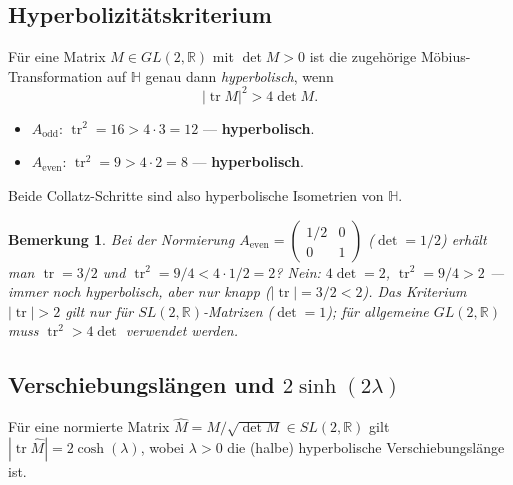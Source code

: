 \documentclass[12pt,a4paper]{article}
\newtheorem{bemerkung}{Bemerkung}[section]
\newcommand{\sinh}{\operatorname{sinh}}
\renewcommand{\cosh}{\operatorname{cosh}}
\newcommand{\tr}{\operatorname{tr}}
\newcommand{\R}{\mathbb{R}}
\begin{document}
\subsection{Hyperbolizitätskriterium}

Für eine Matrix $M \in GL(2,\R)$ mit $\det M > 0$ ist die zugehörige
Möbius-Transformation auf $\mathbb{H}$ genau dann \emph{hyperbolisch}, wenn
\[
  |\tr M|^2 > 4 \det M.
\]
\begin{itemize}[leftmargin=2em]
  \item $A_{\text{odd}}$: $\tr^2 = 16 > 4 \cdot 3 = 12$ — \textbf{hyperbolisch}.
  \item $A_{\text{even}}$: $\tr^2 = 9 > 4 \cdot 2 = 8$ — \textbf{hyperbolisch}.
\end{itemize}
Beide Collatz-Schritte sind also hyperbolische Isometrien von $\mathbb{H}$.

\begin{bemerkung}
Bei der Normierung $A_{\text{even}} = \begin{pmatrix}1/2&0\\0&1\end{pmatrix}$
($\det = 1/2$) erhält man $\tr = 3/2$ und $\tr^2 = 9/4 < 4 \cdot 1/2 = 2$? Nein:
$4\det = 2$, $\tr^2 = 9/4 > 2$ — immer noch hyperbolisch,
aber nur knapp ($|\tr| = 3/2 < 2$). Das Kriterium $|\tr| > 2$ gilt nur für
$SL(2,\R)$-Matrizen ($\det = 1$); für allgemeine $GL(2,\R)$ muss $\tr^2 > 4\det$
verwendet werden.
\end{bemerkung}

\subsection{Verschiebungslängen und $2\sinh(2\lambda)$}

Für eine normierte Matrix $\hat M = M/\sqrt{\det M} \in SL(2,\R)$ gilt
$|\tr \hat M| = 2\cosh(\lambda)$, wobei $\lambda > 0$ die
(halbe) hyperbolische Verschiebungslänge ist.
\end{document}
